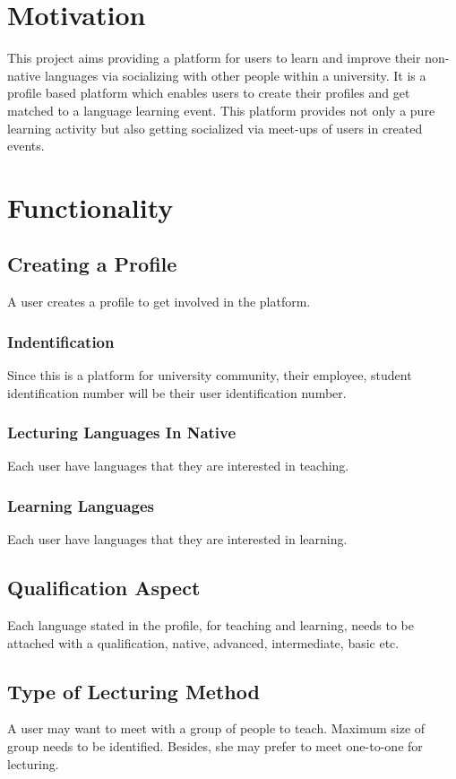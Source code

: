 \lstset{style=mystyle}
\usepackage{amsmath}


\pagestyle{empty} %

\titleBC %
\newpage
\section{Motivation}
This project aims providing a platform for users to learn and improve their non-native languages via socializing with other  people within a university. It is a profile based platform which enables users to create their profiles and get matched to a language learning event. This platform provides not only a pure learning activity but also getting socialized via meet-ups of users in created events.
\section{Functionality}
\subsection{Creating a Profile}
A user creates a profile to get involved in the platform.
 \subsubsection{Indentification}Since this is a platform for university community, their employee, student identification number will be their user identification number. 
 \subsubsection{Lecturing Languages In Native} Each user have languages that they are interested in teaching.  
 \subsubsection{Learning Languages}Each user have languages that they are interested in learning.
\subsection{Qualification Aspect} Each language stated in the profile, for teaching and learning, needs to be attached with a qualification, native, advanced, intermediate, basic etc.  
 \subsection{Type of Lecturing Method} A user may want to meet with a group of people to teach. Maximum size of group needs to be identified. Besides, she may prefer to meet one-to-one for lecturing.
